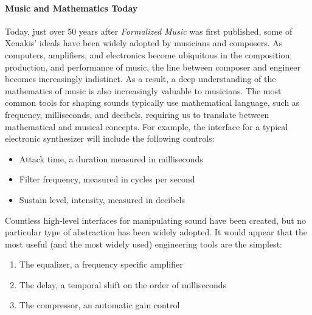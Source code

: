 \paragraph{Music and Mathematics Today}
Today, just over 50 years after \textit{Formalized Music} was first
published, some of Xenakis' ideals have been widely adopted by
musicians and composers. As computers, amplifiers, and electronics
become ubiquitous in the composition, production, and performance of
music, the line between composer and engineer becomes increasingly
indistinct. As a result, a deep understanding of the mathematics of
music is also increasingly valuable to musicians. The most common
tools for shaping sounds typically use mathematical language, such as
frequency, milliseconds, and decibels, requiring us to translate
between mathematical and musical concepts. For example, the interface
for a typical electronic synthesizer will include the following
controls:
\begin{itemize}
\item Attack time, a duration measured in milliseconds
\item Filter frequency, measured in cycles per second
\item Sustain level, intensity, measured in decibels
\end{itemize}
Countless high-level interfaces for manipulating sound have been
created, but no particular type of abstraction has been widely
adopted. It would appear that the most useful (and the most widely
used) engineering tools are the simplest:
\begin{enumerate}
\item The equalizer, a frequency specific amplifier
\item The delay, a temporal shift on the order of milliseconds
\item The compressor, an automatic gain control
\end{enumerate}

